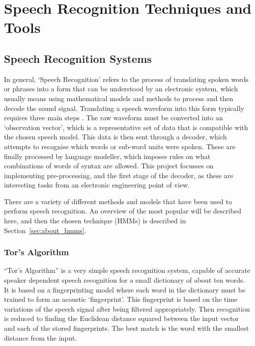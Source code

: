 \chapter{Speech Recognition Techniques and Tools} %
\label{cha:background}


\section{Speech Recognition Systems} %
\label{sec:speech_recognition_systems}
	In general, `Speech Recognition' refers to the process of translating spoken words or phrases into a form that can be understood by an electronic system, which usually means using mathematical models and methods to process and then decode the sound signal.  Translating a speech waveform into this form typically requires three main steps \cite{melnikoff2003speech}.  The raw waveform must be converted into an `observation vector', which is a representative set of data that is compatible with the chosen speech model.  This data is then sent through a decoder, which attempts to recognise which words or sub-word units were spoken.  These are finally processed by language modeller, which imposes rules on what combinations of words of syntax are allowed.  This project focusses on implementing pre-processing, and the first stage of the decoder, as these are interesting tasks from an electronic engineering point of view.

	There are a variety of different methods and models that have been used to perform speech recognition.  An overview of the most popular will be described here, and then the chosen technique (HMMs) is described in Section~\ref{sec:about_hmms}.

	\subsection{Tor's Algorithm} %
	\label{sub:tors_algorithm}
		``Tor's Algorithm''\cite{tor2003} is a very simple speech recognition system, capable of accurate speaker dependent speech recognition for a small dictionary of about ten words.  It is based on a fingerprinting model where each word in the dictionary must be trained to form an acoustic `fingerprint'.  This fingerprint is based on the time variations of the speech signal after being filtered appropriately.  Then recognition is reduced to finding the Euclidean distance squared between the input vector and each of the stored fingerprints.  The best match is the word with the smallest distance from the input.
		
